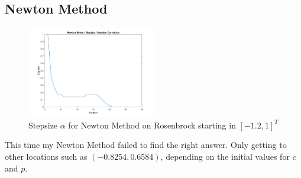 \documentclass[11pt]{article} %
\begin{document}
\subsection*{Newton Method}
\begin{figure}[H]
    \centering
    \includegraphics[width=0.5\textwidth]{newton_2}
    \caption{Stepsize $\alpha$ for Newton Method on Rosenbrock starting in $[-1.2, 1]^T$}
    \label{fig:newton_2}
\end{figure}
This time my Newton Method failed to find the right answer. Only getting to other locations such as $(-0.8254, 0.6584)$, depending on the initial values for $c$ and $p$.
\end{document}
